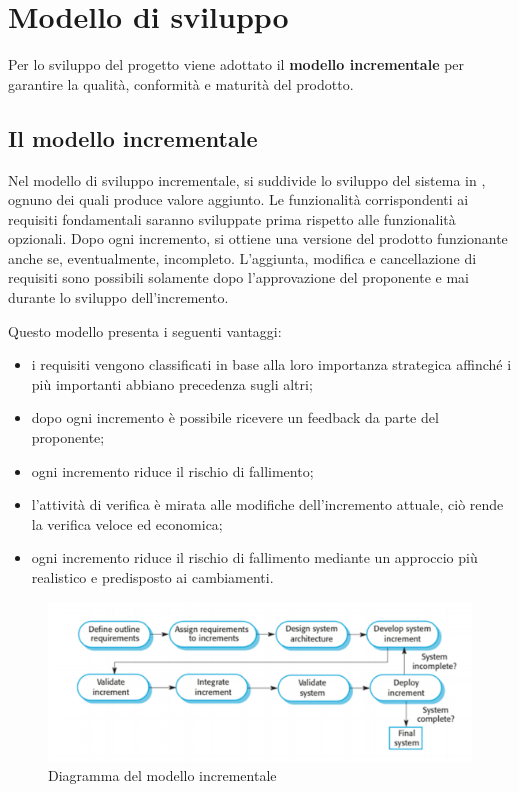 \documentclass[../piano-di-progetto.tex]{subfiles}
\begin{document}
\section{Modello di sviluppo}
Per lo sviluppo del progetto viene adottato il \textbf{modello incrementale} per garantire la qualità, conformità e maturità del prodotto.
\subsection{Il modello incrementale}
Nel modello di sviluppo incrementale, si suddivide lo sviluppo del sistema in , ognuno dei quali produce valore aggiunto. Le funzionalità corrispondenti ai requisiti fondamentali saranno sviluppate prima rispetto alle funzionalità opzionali. Dopo ogni incremento, si ottiene una versione del prodotto funzionante anche se, eventualmente, incompleto. L’aggiunta, modifica e cancellazione di requisiti sono possibili solamente dopo l'approvazione del proponente e mai durante lo sviluppo dell'incremento.

Questo modello presenta i seguenti vantaggi:
\begin{itemize}
    \item i requisiti vengono classificati in base alla loro importanza strategica affinché i più importanti abbiano precedenza sugli altri;
    \item dopo ogni incremento è possibile ricevere un feedback da parte del proponente;
    \item ogni incremento riduce il rischio di fallimento;
    \item l'attività di verifica è mirata alle modifiche dell'incremento attuale, ciò rende la verifica veloce ed economica;
    \item ogni incremento riduce il rischio di fallimento mediante un approccio più realistico e predisposto ai cambiamenti.

\end{itemize}

\begin{figure}[H]
	\centering
    \includegraphics[width=16cm]{img/modello-incrementale.png}
    \caption{Diagramma del modello incrementale} 
	\label{fig:modello-incrementale}
  \end{figure}
  
\end{document}
